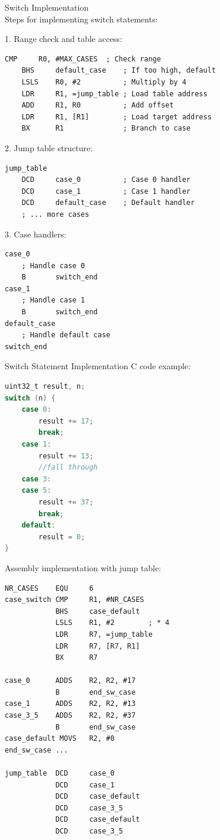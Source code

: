 \begin{KR}{Switch Implementation}\\
Steps for implementing switch statements:

1. Range check and table access:
\begin{lstlisting}[language=armasm, style=basesmol]
    CMP     R0, #MAX_CASES  ; Check range
    BHS     default_case    ; If too high, default
    LSLS    R0, #2          ; Multiply by 4
    LDR     R1, =jump_table ; Load table address
    ADD     R1, R0          ; Add offset
    LDR     R1, [R1]        ; Load target address
    BX      R1              ; Branch to case
\end{lstlisting}

2. Jump table structure:
\begin{lstlisting}[language=armasm, style=basesmol]
jump_table
    DCD     case_0          ; Case 0 handler
    DCD     case_1          ; Case 1 handler
    DCD     default_case    ; Default handler
    ; ... more cases
\end{lstlisting}

3. Case handlers:
\begin{lstlisting}[language=armasm, style=basesmol]
case_0
    ; Handle case 0
    B       switch_end
case_1
    ; Handle case 1
    B       switch_end
default_case
    ; Handle default case
switch_end
\end{lstlisting}
\end{KR}

\begin{example2}{Switch Statement Implementation}
C code example:
\begin{lstlisting}[language=C, style=basesmol]
uint32_t result, n;
switch (n) {
    case 0:
        result += 17;
        break;
    case 1:
        result += 13;
        //fall through
    case 3: 
    case 5:
        result += 37;
        break;
    default:
        result = 0;
}
\end{lstlisting}

Assembly implementation with jump table:
\begin{lstlisting}[language=armasm, style=basesmol]
NR_CASES    EQU     6
case_switch CMP     R1, #NR_CASES
            BHS     case_default
            LSLS    R1, #2        ; * 4
            LDR     R7, =jump_table
            LDR     R7, [R7, R1]
            BX      R7

case_0      ADDS    R2, R2, #17
            B       end_sw_case
case_1      ADDS    R2, R2, #13
case_3_5    ADDS    R2, R2, #37
            B       end_sw_case
case_default MOVS   R2, #0
end_sw_case ...

jump_table  DCD     case_0
            DCD     case_1
            DCD     case_default
            DCD     case_3_5
            DCD     case_default
            DCD     case_3_5
\end{lstlisting}
\end{example2}

